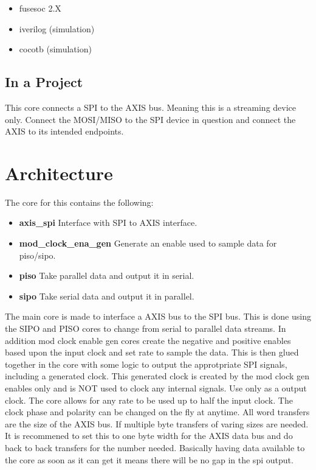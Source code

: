 \begin{itemize}
  \item fusesoc 2.X
  \item iverilog (simulation)
  \item cocotb (simulation)
\end{itemize}



\subsection{In a Project}
\par
This core connects a SPI to the AXIS bus. Meaning this is a streaming device only. Connect the MOSI/MISO to the SPI device in question and connect the AXIS to its intended endpoints.

\section{Architecture}
\par
The core for this contains the following:
\begin{itemize}
  \item \textbf{axis\_spi} Interface with SPI to AXIS interface.
  \item \textbf{mod\_clock\_ena\_gen} Generate an enable used to sample data for piso/sipo.
  \item \textbf{piso} Take parallel data and output it in serial.
  \item \textbf{sipo} Take serial data and output it in parallel.
\end{itemize}

The main core is made to interface a AXIS bus to the SPI bus. This is done using the SIPO and PISO cores to change from serial to parallel data streams.
In addition mod clock enable gen cores create the negative and positive enables based upon the input clock and set rate to sample the data. This is then
glued together in the core with some logic to output the approtpriate SPI signals, including a generated clock. This generated clock is created by
the mod clock gen enables only and is NOT used to clock any internal signals. Use only as a output clock. The core allows for any rate to be used up to
half the input clock. The clock phase and polarity can be changed on the fly at anytime. All word transfers are the size of the AXIS bus. If multiple
byte transfers of varing sizes are needed. It is recommened to set this to one byte width for the AXIS data bus and do back to back transfers for the
number needed. Basically having data available to the core as soon as it can get it means there will be no gap in the spi output.


